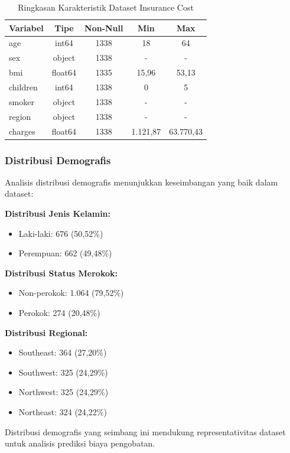 \begin{table}[H]
\centering
\caption{Ringkasan Karakteristik Dataset Insurance Cost}
\label{tab:dataset-summary}
\begin{tabular}{|l|c|c|c|c|}
\hline
\textbf{Variabel} & \textbf{Tipe} & \textbf{Non-Null} & \textbf{Min} & \textbf{Max} \\
\hline
age & int64 & 1338 & 18 & 64 \\
sex & object & 1338 & - & - \\
bmi & float64 & 1335 & 15,96 & 53,13 \\
children & int64 & 1338 & 0 & 5 \\
smoker & object & 1338 & - & - \\
region & object & 1338 & - & - \\
charges & float64 & 1338 & 1.121,87 & 63.770,43 \\
\hline
\end{tabular}
\end{table}

\subsubsection{Distribusi Demografis}

Analisis distribusi demografis menunjukkan keseimbangan yang baik dalam dataset:

\textbf{Distribusi Jenis Kelamin:}
\begin{itemize}
    \item Laki-laki: 676 (50,52\%)
    \item Perempuan: 662 (49,48\%)
\end{itemize}

\textbf{Distribusi Status Merokok:}
\begin{itemize}
    \item Non-perokok: 1.064 (79,52\%)
    \item Perokok: 274 (20,48\%)
\end{itemize}

\textbf{Distribusi Regional:}
\begin{itemize}
    \item Southeast: 364 (27,20\%)
    \item Southwest: 325 (24,29\%)
    \item Northwest: 325 (24,29\%)
    \item Northeast: 324 (24,22\%)
\end{itemize}

Distribusi demografis yang seimbang ini mendukung representativitas dataset untuk analisis prediksi biaya pengobatan.

